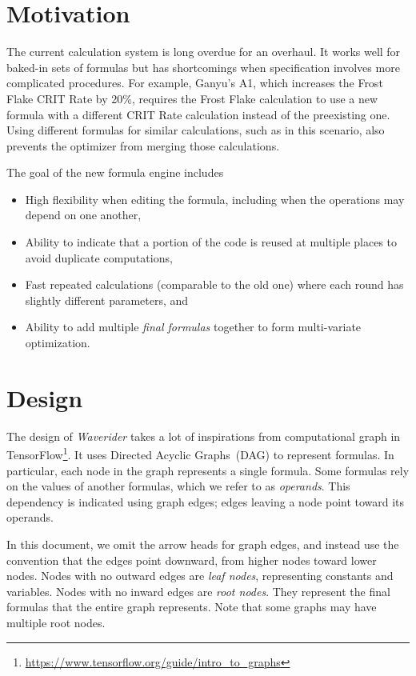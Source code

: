 \documentclass{article}
\begin{document}
\section{Motivation}

The current calculation system is long overdue for an overhaul. It works well for baked-in sets of formulas but has shortcomings when specification involves more complicated procedures. For example, Ganyu's A1, which increases the Frost Flake CRIT Rate by 20\%, requires the Frost Flake calculation to use a new formula with a different CRIT Rate calculation instead of the preexisting one. Using different formulas for similar calculations, such as in this scenario, also prevents the optimizer from merging those calculations.

The goal of the new formula engine includes

\begin{itemize}
	\item High flexibility when editing the formula, including when the operations may depend on one another,
	\item Ability to indicate that a portion of the code is reused at multiple places to avoid duplicate computations,
	\item Fast repeated calculations (comparable to the old one) where each round has slightly different parameters, and
	\item Ability to add multiple \emph{final formulas} together to form multi-variate optimization.
\end{itemize}

\section{Design}

The design of \emph{Waverider} takes a lot of inspirations from computational graph in TensorFlow\footnote{
	\url{https://www.tensorflow.org/guide/intro_to_graphs}
}.
It uses Directed Acyclic Graphs~(DAG) to represent formulas.
In particular, each node in the graph represents a single formula.
Some formulas rely on the values of another formulas, which we refer to as \emph{operands}.
This dependency is indicated using graph edges; edges leaving a node point toward its operands.

In this document, we omit the arrow heads for graph edges, and instead use the convention that the edges point downward, from higher nodes toward lower nodes.
Nodes with no outward edges are \emph{leaf nodes}, representing constants and variables.
Nodes with no inward edges are \emph{root nodes}.
They represent the final formulas that the entire graph represents.
Note that some graphs may have multiple root nodes.
\end{document}
